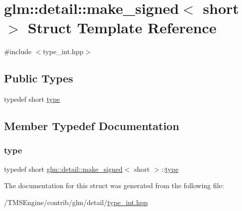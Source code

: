 \hypertarget{structglm_1_1detail_1_1make__signed_3_01short_01_4}{}\section{glm\+:\+:detail\+:\+:make\+\_\+signed$<$ short $>$ Struct Template Reference}
\label{structglm_1_1detail_1_1make__signed_3_01short_01_4}


{\ttfamily \#include $<$type\+\_\+int.\+hpp$>$}

\subsection*{Public Types}
\begin{DoxyCompactItemize}
\item 
typedef short \hyperlink{structglm_1_1detail_1_1make__signed_3_01short_01_4_a9488d8ffbd34998675456fa6d1143989}{type}
\end{DoxyCompactItemize}


\subsection{Member Typedef Documentation}
\mbox{\label{structglm_1_1detail_1_1make__signed_3_01short_01_4_a9488d8ffbd34998675456fa6d1143989}} 
\subsubsection{\texorpdfstring{type}{type}}
{\footnotesize\ttfamily typedef short \hyperlink{structglm_1_1detail_1_1make__signed}{glm\+::detail\+::make\+\_\+signed}$<$ short $>$\+::\hyperlink{structglm_1_1detail_1_1make__signed_3_01short_01_4_a9488d8ffbd34998675456fa6d1143989}{type}}



The documentation for this struct was generated from the following file\+:\begin{DoxyCompactItemize}
\item 
/\+T\+M\+S\+Engine/contrib/glm/detail/\hyperlink{type__int_8hpp}{type\+\_\+int.\+hpp}\end{DoxyCompactItemize}
